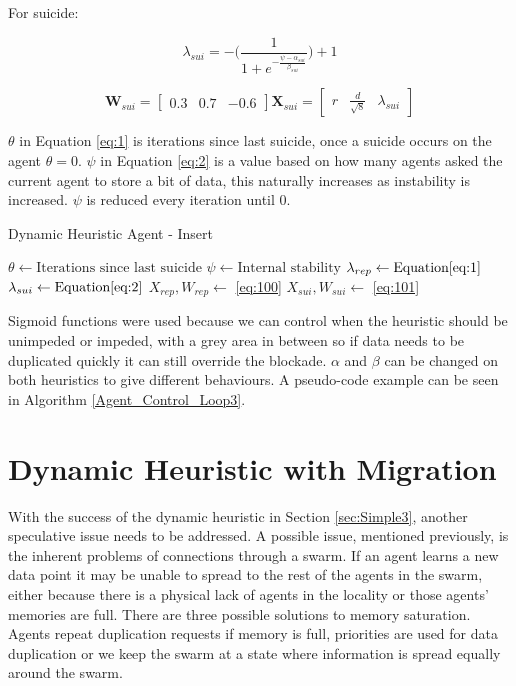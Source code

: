 \documentclass{UoYCSproject}
\begin{document}
For suicide:

\begin{equation}
\label{eq:2}
\lambda_{sui} = - \big( \frac{1}{1+ e^{- \frac{\psi - \alpha_{sui} }{ \beta_{sui} } } } \big) + 1
\end{equation}

\begin{equation}
\label{eq:101}
\textbf{W}_{sui} = \begin{bmatrix}0.3 & 0.7 & -0.6 \end{bmatrix}
\textbf{X}_{sui} = \begin{bmatrix} r & \frac{d}{\sqrt{8}} & \lambda_{sui} \end{bmatrix}
\end{equation}

$\theta$ in Equation \ref{eq:1} is iterations since last suicide, once a suicide occurs on the agent $\theta=0$.
$\psi$ in Equation \ref{eq:2} is a value based on how many agents asked the current agent to store a bit of data, this naturally increases as instability is increased.
$\psi$ is reduced every iteration until 0.

\begin{algorithm}
\caption{Dynamic Heuristic Agent - Insert}
\label{Agent_Control_Loop3}
\begin{algorithmic}[1]
\State $\theta \gets \text{Iterations since last suicide}$
\State $\psi \gets \text{Internal stability}$
\State $\lambda_{rep} \gets \text{Equation} \ref{eq:1}$
\State $\lambda_{sui} \gets \text{Equation} \ref{eq:2}$
\State $X_{rep}, W_{rep} \gets $ \ref{eq:100}
\State $X_{sui}, W_{sui} \gets $ \ref{eq:101}
\end{algorithmic}
\end{algorithm}

Sigmoid functions were used because we can control when the heuristic should be unimpeded or impeded, with a grey area in between so if data needs to be duplicated quickly it can still override the blockade.
$\alpha$ and $\beta$ can be changed on both heuristics to give different behaviours.
A pseudo-code example can be seen in Algorithm \ref{Agent_Control_Loop3}.


\section{Dynamic Heuristic with Migration}
\label{sec:Simple4}

With the success of the dynamic heuristic in Section \ref{sec:Simple3}, another speculative issue needs to be addressed.
A possible issue, mentioned previously, is the inherent problems of connections through a swarm.
If an agent learns a new data point it may be unable to spread to the rest of the agents in the swarm, either because there is a physical lack of agents in the locality or those agents' memories are full.
There are three possible solutions to memory saturation.
Agents repeat duplication requests if memory is full, priorities are used for data duplication or we keep the swarm at a state where information is spread equally around the swarm.
\end{document}
